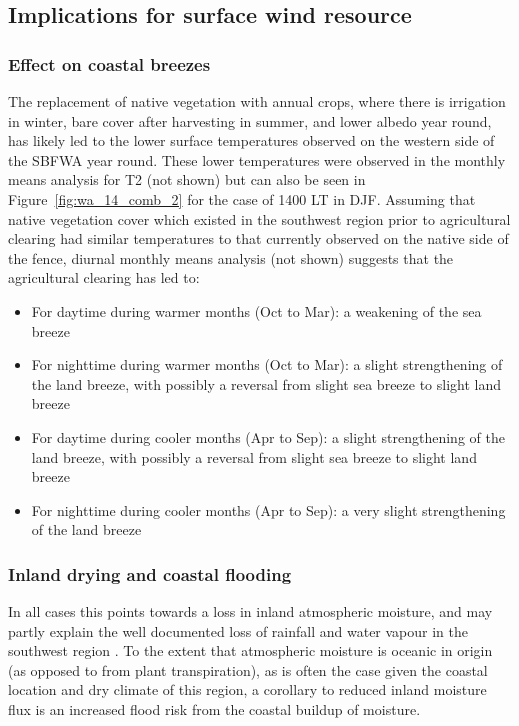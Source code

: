 \subsection{Implications for surface wind resource} 
\label{ssec:implications}

\subsubsection{Effect on coastal breezes}

The replacement of native vegetation with annual crops, where there is irrigation in winter, bare cover after harvesting in summer, and lower albedo year round, has likely led to the lower surface temperatures observed on the western side of the \ac{SBFWA} year round. These lower temperatures were observed in the monthly means analysis for \ac{T2} (not shown) but can also be seen in Figure~\ref{fig:wa_14_comb_2} for the case of 1400 \ac{LT} in \ac{DJF}. Assuming that native vegetation cover which existed in the southwest region prior to agricultural clearing had similar temperatures to that currently observed on the native side of the fence, diurnal monthly means analysis (not shown) suggests that the agricultural clearing has led to:
\begin{itemize}
	\item For daytime during warmer months (Oct to Mar): a weakening of the sea breeze
	\item For nighttime during warmer months (Oct to Mar): a slight strengthening of the land breeze, with possibly a reversal from slight sea breeze to slight land breeze
	\item For daytime during cooler months (Apr to Sep): a slight strengthening of the land breeze, with possibly a reversal from slight sea breeze to slight land breeze
	\item For nighttime during cooler months (Apr to Sep): a very slight strengthening of the land breeze
\end{itemize}

\subsubsection{Inland drying and coastal flooding}

In all cases this points towards a loss in inland atmospheric moisture, and may partly explain the well documented loss of rainfall and water vapour in the southwest region \citep{gordon2003, narisma2003, pitman2004, junkermann2009}. To the extent that atmospheric moisture is oceanic in origin (as opposed to from plant transpiration), as is often the case given the coastal location and dry climate of this region, a corollary to reduced inland moisture flux is an increased flood risk from the coastal buildup of moisture.

